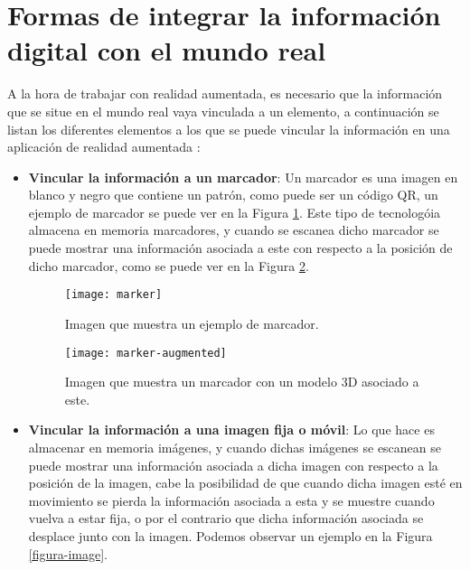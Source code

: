 \begin{itemize}
\begin{itemize}
\begin{itemize}

\end{itemize}

\newpage

\section{Formas de integrar la información digital con el mundo real}
A la hora de trabajar con realidad aumentada, es necesario que la información que se situe en el mundo real vaya vinculada a un elemento, a continuación se listan los diferentes elementos a los que se puede vincular la información en una aplicación de realidad aumentada \cite{prendes-espinosa}:

\begin{itemize}
  \item \textbf{Vincular la información a un marcador}: Un marcador es una imagen en blanco y negro que contiene un patrón, como puede ser un código QR, un ejemplo de marcador se puede ver en la Figura \ref{figura-marcador}. Este tipo de tecnologóia almacena en memoria marcadores, y cuando se escanea dicho marcador se puede mostrar una información asociada a este con respecto a la posición de dicho marcador, como se puede ver en la Figura \ref{figura-marcador-aumentado}.

  \begin{figure}
    \centering
    \texttt{[image: marker]}
    \caption{Imagen que muestra un ejemplo de marcador.}
    \label{figura-marcador}
  \end{figure}

  \begin{figure}[h]
    \centering
    \texttt{[image: marker-augmented]}
    \caption{Imagen que muestra un marcador con un modelo 3D asociado a este.\protect\footnotemark}
    \label{figura-marcador-aumentado}
  \end{figure}


  \newpage

  \item \textbf{Vincular la información a una imagen fija o móvil}: Lo que hace es almacenar en memoria imágenes, y cuando dichas imágenes se escanean se puede mostrar una información asociada a dicha imagen con respecto a la posición de la imagen, cabe la posibilidad de que cuando dicha imagen esté en movimiento se pierda la información asociada a esta y se muestre cuando vuelva a estar fija, o por el contrario que dicha información asociada se desplace junto con la imagen. Podemos observar un ejemplo en la Figura \ref{figura-image}.


\end{itemize}
\end{itemize}
\end{itemize}
